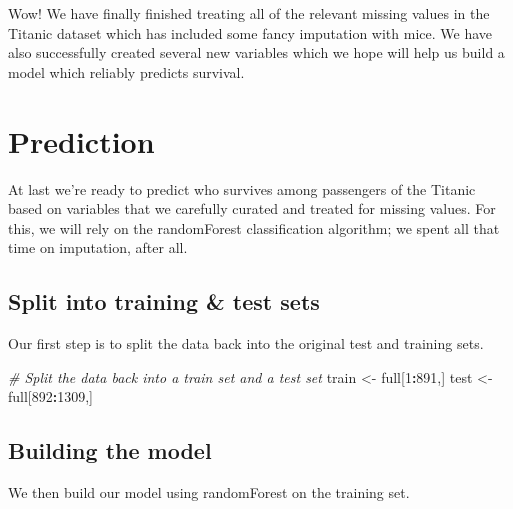 \documentclass[]{book}
\newenvironment{Shaded}{\begin{snugshade}}{\end{snugshade}}
\newcommand{\DecValTok}[1]{\textcolor[rgb]{0.00,0.00,0.81}{#1}}
\newcommand{\StringTok}[1]{\textcolor[rgb]{0.31,0.60,0.02}{#1}}
\newcommand{\CommentTok}[1]{\textcolor[rgb]{0.56,0.35,0.01}{\textit{#1}}}
\newcommand{\OperatorTok}[1]{\textcolor[rgb]{0.81,0.36,0.00}{\textbf{#1}}}
\newcommand{\NormalTok}[1]{#1}
\theoremstyle{definition}
\theoremstyle{definition}
\theoremstyle{definition}
\theoremstyle{remark}
\begin{document}
Wow! We have finally finished treating all of the relevant missing
values in the Titanic dataset which has included some fancy imputation
with mice. We have also successfully created several new variables which
we hope will help us build a model which reliably predicts survival.

\section{Prediction}\label{prediction}

At last we're ready to predict who survives among passengers of the
Titanic based on variables that we carefully curated and treated for
missing values. For this, we will rely on the randomForest
classification algorithm; we spent all that time on imputation, after
all.

\subsection{Split into training \& test
sets}\label{split-into-training-test-sets}

Our first step is to split the data back into the original test and
training sets.

\begin{Shaded}
\begin{Highlighting}[]
\CommentTok{# Split the data back into a train set and a test set}
\NormalTok{train <-}\StringTok{ }\NormalTok{full[}\DecValTok{1}\OperatorTok{:}\DecValTok{891}\NormalTok{,]}
\NormalTok{test <-}\StringTok{ }\NormalTok{full[}\DecValTok{892}\OperatorTok{:}\DecValTok{1309}\NormalTok{,]}
\end{Highlighting}
\end{Shaded}

\subsection{Building the model}\label{building-the-model}

We then build our model using randomForest on the training set.
\end{document}
